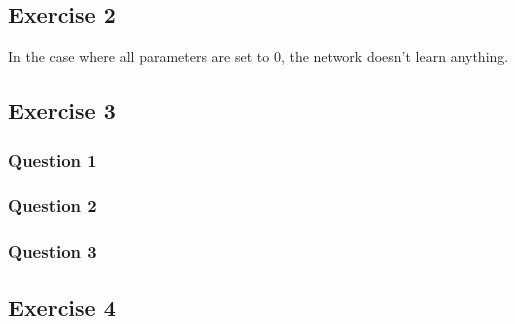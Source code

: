\documentclass[12pt]{article}
\begin{document}
\subsection{Exercise 2}
In the case where all parameters are set to 0, the network doesn't learn anything.


\subsection{Exercise 3}
\subsubsection{Question 1}
\subsubsection{Question 2}
\subsubsection{Question 3}
\subsection{Exercise 4}

\newpage
\appendix
\end{document}
